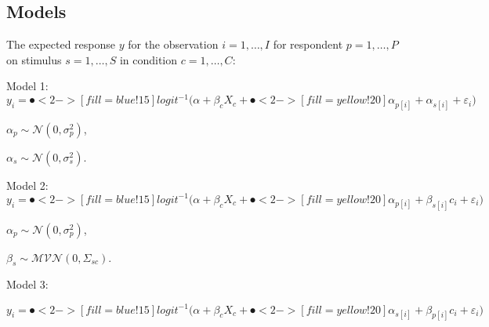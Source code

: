 \documentclass[compress]{beamer}
\begin{document}
\subsection{Models}

\begin{frame}
	\begin{footnotesize}
		The expected response $y$ for the observation $i = 1, \ldots, I$ for respondent $p = 1,\ldots, P$ on stimulus $s = 1,\ldots, S$ in condition $c= 1,\ldots, C$:
	\end{footnotesize}
	\footnotesize
	
	
	\vspace{3mm}
	Model 1:
	\begin{equation*}\label{AccuracyMin}
		y_{i} = \spot<2->[fill =blue!15]{logit^{-1}(\alpha + \beta_c X_c}  + \spot<2->[fill=yellow!20]{\alpha_{p[i]} +  \alpha_{s[i]} + \varepsilon_{i})}
	\end{equation*}
	\begin{centering}
		
		$\alpha_p \sim \mathcal{N}(0, \sigma_p^2)$,
		
	\end{centering}
	
	\begin{centering}
		
		$\alpha_s \sim \mathcal{N}(0, \sigma_s^2)$.
		
	\end{centering}
	
	
	
	Model 2: 
	\begin{equation*}\label{Accuracy5}
		y_{i} = \spot<2->[fill =blue!15]{logit^{-1}(\alpha + \beta_c X_c}  + \spot<2->[fill=yellow!20]{ \alpha_{p[i]} +  \beta_{s[i]}c_{i} + \varepsilon_{i})}
	\end{equation*}
	
	\begin{centering}
		$\alpha_p \sim \mathcal{N}(0, \sigma_p^2)$,
		
	\end{centering}
	
	\begin{centering}
		
		$\beta_s \sim \mathcal{MVN}(0, \Sigma_{sc})$.
		
	\end{centering}
	
	Model 3: 
	
	\begin{equation*}
		y_{i} = \spot<2->[fill =blue!15]{logit^{-1}(\alpha + \beta_c X_c}  + \spot<2->[fill=yellow!20]{\alpha_{s[i]} +  \beta_{p[i]}c_{i} + \varepsilon_{i})}
	\end{equation*}
	

\end{frame}
\end{document}
